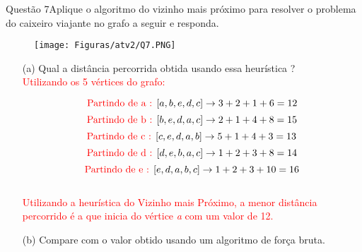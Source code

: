 \documentclass[12pt]{article}
\begin{document}
\newpage

\begin{section}{Questão 7}{Aplique o algoritmo do vizinho mais próximo para resolver o problema do caixeiro viajante no grafo a seguir e responda.}

\begin{figure}[H]
    \centering
    \texttt{[image: Figuras/atv2/Q7.PNG]}
\end{figure}




\begin{itemize}
    \item[(a)] Qual a distância percorrida obtida usando essa heurística ?\\
    
\noindent \textcolor{red}{Utilizando os 5 vértices do grafo:}

$$\text{\textcolor{red}{Partindo de a : }} [a,b,e,d,c] \rightarrow 3+2+1+6 = 12$$
$$\text{\textcolor{red}{Partindo de b : }} [b,e,d,a,c] \rightarrow 2+1+4+8 = 15$$
$$\text{\textcolor{red}{Partindo de c : }} [c,e,d,a,b] \rightarrow 5+1+4+3 = 13$$
$$\text{\textcolor{red}{Partindo de d : }} [d,e,b,a,c] \rightarrow 1+2+3+8 = 14$$
$$\text{\textcolor{red}{Partindo de e : }} [e,d,a,b,c] \rightarrow 1+2+3+10 = 16$$\\

\textcolor{red}{Utilizando a heurística do Vizinho mais Próximo, a menor distância percorrido é a que inicia do vértice \textit{a} com um valor de 12.}
    
    \item[(b)] Compare com o valor obtido usando um algoritmo de força bruta.
    

\end{itemize}
\end{section}
\end{document}
